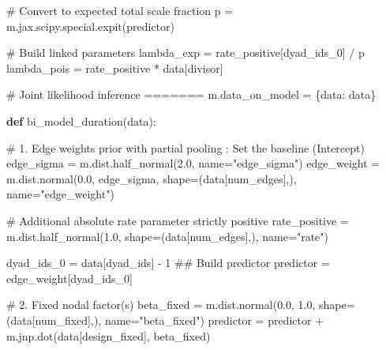 \documentclass[
  letterpaper,
  DIV=11,
  numbers=noendperiod]{scrartcl}
\newenvironment{Shaded}{\begin{snugshade}}{\end{snugshade}}
\newcommand{\CommentTok}[1]{\textcolor[rgb]{0.37,0.37,0.37}{#1}}
\newcommand{\DecValTok}[1]{\textcolor[rgb]{0.68,0.00,0.00}{#1}}
\newcommand{\FloatTok}[1]{\textcolor[rgb]{0.68,0.00,0.00}{#1}}
\newcommand{\KeywordTok}[1]{\textcolor[rgb]{0.00,0.23,0.31}{\textbf{#1}}}
\newcommand{\NormalTok}[1]{\textcolor[rgb]{0.00,0.23,0.31}{#1}}
\newcommand{\OperatorTok}[1]{\textcolor[rgb]{0.37,0.37,0.37}{#1}}
\newcommand{\StringTok}[1]{\textcolor[rgb]{0.13,0.47,0.30}{#1}}
\begin{document}
\begin{Shaded}
\begin{Highlighting}[]
    \CommentTok{\# Convert to expected total scale fraction}
\NormalTok{    p }\OperatorTok{=}\NormalTok{ m.jax.scipy.special.expit(predictor)}
    
    \CommentTok{\# Build linked parameters}
\NormalTok{    lambda\_exp }\OperatorTok{=}\NormalTok{ rate\_positive[dyad\_ids\_0] }\OperatorTok{/}\NormalTok{ p}
\NormalTok{    lambda\_pois }\OperatorTok{=}\NormalTok{ rate\_positive }\OperatorTok{*}\NormalTok{ data[}\StringTok{\textquotesingle{}divisor\textquotesingle{}}\NormalTok{]}
    
    \CommentTok{\# Joint likelihood inference}
\OperatorTok{=======}
\NormalTok{m.data\_on\_model }\OperatorTok{=}\NormalTok{ \{}\StringTok{\textquotesingle{}data\textquotesingle{}}\NormalTok{: data\} }

\KeywordTok{def}\NormalTok{ bi\_model\_duration(data):}

    \CommentTok{\# 1. Edge weights prior with partial pooling : Set the baseline (Intercept)}
\NormalTok{    edge\_sigma }\OperatorTok{=}\NormalTok{ m.dist.half\_normal(}\FloatTok{2.0}\NormalTok{, name}\OperatorTok{=}\StringTok{"edge\_sigma"}\NormalTok{)}
\NormalTok{    edge\_weight }\OperatorTok{=}\NormalTok{ m.dist.normal(}\FloatTok{0.0}\NormalTok{, edge\_sigma, shape}\OperatorTok{=}\NormalTok{(data[}\StringTok{\textquotesingle{}num\_edges\textquotesingle{}}\NormalTok{],), name}\OperatorTok{=}\StringTok{"edge\_weight"}\NormalTok{)}
    
    \CommentTok{\# Additional absolute rate parameter strictly positive}
\NormalTok{    rate\_positive }\OperatorTok{=}\NormalTok{ m.dist.half\_normal(}\FloatTok{1.0}\NormalTok{, shape}\OperatorTok{=}\NormalTok{(data[}\StringTok{\textquotesingle{}num\_edges\textquotesingle{}}\NormalTok{],), name}\OperatorTok{=}\StringTok{"rate"}\NormalTok{)}
    
\NormalTok{    dyad\_ids\_0 }\OperatorTok{=}\NormalTok{ data[}\StringTok{\textquotesingle{}dyad\_ids\textquotesingle{}}\NormalTok{] }\OperatorTok{{-}} \DecValTok{1}
    \CommentTok{\#\# Build predictor}
\NormalTok{    predictor }\OperatorTok{=}\NormalTok{ edge\_weight[dyad\_ids\_0]}
    
    \CommentTok{\# 2. Fixed nodal factor(s)}
\NormalTok{    beta\_fixed }\OperatorTok{=}\NormalTok{ m.dist.normal(}\FloatTok{0.0}\NormalTok{, }\FloatTok{1.0}\NormalTok{, shape}\OperatorTok{=}\NormalTok{(data[}\StringTok{\textquotesingle{}num\_fixed\textquotesingle{}}\NormalTok{],), name}\OperatorTok{=}\StringTok{"beta\_fixed"}\NormalTok{)}
\NormalTok{    predictor }\OperatorTok{=}\NormalTok{ predictor }\OperatorTok{+}\NormalTok{ m.jnp.dot(data[}\StringTok{\textquotesingle{}design\_fixed\textquotesingle{}}\NormalTok{], beta\_fixed)}


\end{Highlighting}
\end{Shaded}
\end{document}
